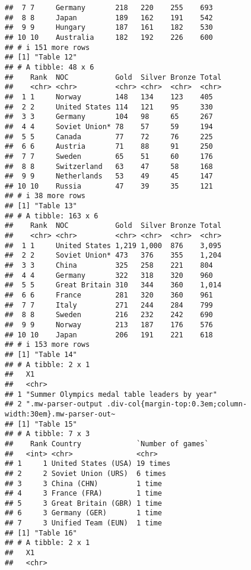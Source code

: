 \documentclass[
]{article}
\begin{document}
\begin{verbatim}
##  7 7     Germany       218   220    255    693  
##  8 8     Japan         189   162    191    542  
##  9 9     Hungary       187   161    182    530  
## 10 10    Australia     182   192    226    600  
## # i 151 more rows
## [1] "Table 12"
## # A tibble: 48 x 6
##    Rank  NOC           Gold  Silver Bronze Total
##    <chr> <chr>         <chr> <chr>  <chr>  <chr>
##  1 1     Norway        148   134    123    405  
##  2 2     United States 114   121    95     330  
##  3 3     Germany       104   98     65     267  
##  4 4     Soviet Union* 78    57     59     194  
##  5 5     Canada        77    72     76     225  
##  6 6     Austria       71    88     91     250  
##  7 7     Sweden        65    51     60     176  
##  8 8     Switzerland   63    47     58     168  
##  9 9     Netherlands   53    49     45     147  
## 10 10    Russia        47    39     35     121  
## # i 38 more rows
## [1] "Table 13"
## # A tibble: 163 x 6
##    Rank  NOC           Gold  Silver Bronze Total
##    <chr> <chr>         <chr> <chr>  <chr>  <chr>
##  1 1     United States 1,219 1,000  876    3,095
##  2 2     Soviet Union* 473   376    355    1,204
##  3 3     China         325   258    221    804  
##  4 4     Germany       322   318    320    960  
##  5 5     Great Britain 310   344    360    1,014
##  6 6     France        281   320    360    961  
##  7 7     Italy         271   244    284    799  
##  8 8     Sweden        216   232    242    690  
##  9 9     Norway        213   187    176    576  
## 10 10    Japan         206   191    221    618  
## # i 153 more rows
## [1] "Table 14"
## # A tibble: 2 x 1
##   X1                                                                            
##   <chr>                                                                         
## 1 "Summer Olympics medal table leaders by year"                                 
## 2 ".mw-parser-output .div-col{margin-top:0.3em;column-width:30em}.mw-parser-out~
## [1] "Table 15"
## # A tibble: 7 x 3
##    Rank Country             `Number of games`
##   <int> <chr>               <chr>            
## 1     1 United States (USA) 19 times         
## 2     2 Soviet Union (URS)  6 times          
## 3     3 China (CHN)         1 time           
## 4     3 France (FRA)        1 time           
## 5     3 Great Britain (GBR) 1 time           
## 6     3 Germany (GER)       1 time           
## 7     3 Unified Team (EUN)  1 time           
## [1] "Table 16"
## # A tibble: 2 x 1
##   X1                                                                            
##   <chr>                                                                         

\end{verbatim}
\end{document}
